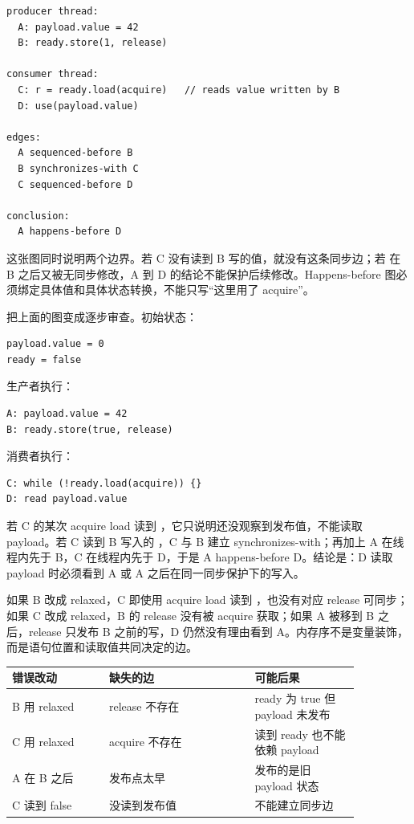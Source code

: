 \begin{lstlisting}[numbers=none,caption={message passing 的 happens-before 图}]
producer thread:
  A: payload.value = 42
  B: ready.store(1, release)

consumer thread:
  C: r = ready.load(acquire)   // reads value written by B
  D: use(payload.value)

edges:
  A sequenced-before B
  B synchronizes-with C
  C sequenced-before D

conclusion:
  A happens-before D
\end{lstlisting}

这张图同时说明两个边界。若 C 没有读到 B 写的值，就没有这条同步边；若  在 B 之后又被无同步修改，A 到 D 的结论不能保护后续修改。Happens-before 图必须绑定具体值和具体状态转换，不能只写“这里用了 acquire”。

把上面的图变成逐步审查。初始状态：

\begin{lstlisting}[numbers=none,caption={message passing 初始状态}]
payload.value = 0
ready = false
\end{lstlisting}

生产者执行：

\begin{lstlisting}[numbers=none]
A: payload.value = 42
B: ready.store(true, release)
\end{lstlisting}

消费者执行：

\begin{lstlisting}[numbers=none]
C: while (!ready.load(acquire)) {}
D: read payload.value
\end{lstlisting}

若 C 的某次 acquire load 读到 ，它只说明还没观察到发布值，不能读取 payload。若 C 读到 B 写入的 ，C 与 B 建立 synchronizes-with；再加上 A 在线程内先于 B，C 在线程内先于 D，于是 A happens-before D。结论是：D 读取 payload 时必须看到 A 或 A 之后在同一同步保护下的写入。

如果 B 改成 relaxed，C 即使用 acquire load 读到 ，也没有对应 release 可同步；如果 C 改成 relaxed，B 的 release 没有被 acquire 获取；如果 A 被移到 B 之后，release 只发布 B 之前的写，D 仍然没有理由看到 A。内存序不是变量装饰，而是语句位置和读取值共同决定的边。

\begin{center}
\begin{tabular}{p{0.24\linewidth}p{0.36\linewidth}p{0.26\linewidth}}
\toprule
错误改动 & 缺失的边 & 可能后果 \\
\midrule
B 用 relaxed & release 不存在 & ready 为 true 但 payload 未发布 \\
C 用 relaxed & acquire 不存在 & 读到 ready 也不能依赖 payload \\
A 在 B 之后 & 发布点太早 & 发布的是旧 payload 状态 \\
C 读到 false & 没读到发布值 & 不能建立同步边 \\
\bottomrule
\end{tabular}
\end{center}

